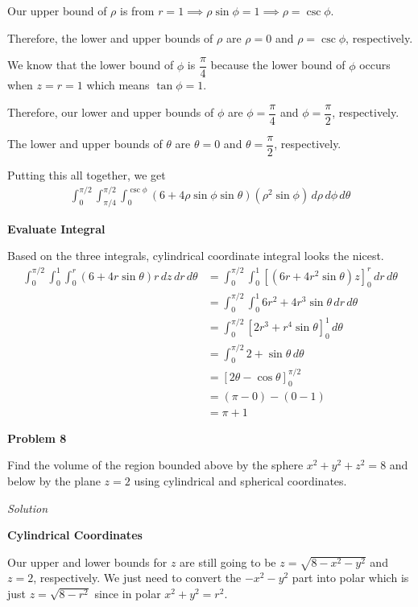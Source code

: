 \documentclass{article}
\newcommand{\lrp}[1]{\left( #1 \right)}
\newcommand{\lrb}[1]{\left[ #1 \right]}
\newcommand{\Solution}{\textit{Solution}}
\begin{document}
Our upper bound of $\rho$ is from $r=1\implies \rho \sin\phi = 1\implies \rho =\csc\phi$.

Therefore, the lower and upper bounds of $\rho$ are $\rho = 0$ and $\rho = \csc\phi$, respectively.

We know that the lower bound of $\phi$ is $\dfrac{\pi}{4}$ because the lower bound of $\phi$ occurs when $z=r=1$ which means $\tan\phi = 1$.

Therefore, our lower and upper bounds of $\phi$ are $\phi =\dfrac{\pi}{4}$ and $\phi =\dfrac{\pi}{2}$, respectively. 

The lower and upper bounds of $\theta$ are $\theta=0$ and $\theta=\dfrac{\pi}{2}$, respectively.

Putting this all together, we get
\begin{align*}
    \int_0^{\pi/2}\int_{\pi/4}^{\pi/2}\int_0^{\csc\phi} (6+4\rho\sin\phi\sin\theta)(\rho^2\sin\phi)\,d\rho\,d\phi\,d\theta\tag{in spherical, $y=\rho\sin\phi\sin\theta$}
\end{align*}
{}\textbf{Evaluate Integral}

Based on the three integrals, cylindrical coordinate integral looks the nicest.
\begin{align*}
     \int_{0}^{\pi/2}\int_0^1\int_0^r (6+4r\sin\theta)r\,dz\,dr\,d\theta&=\int_0^{\pi/2}\int_0^1\lrb{(6r+4r^2\sin\theta)z}_0^r\,dr\,d\theta\\
     &=\int_0^{\pi/2}\int_0^1 6r^2+4r^3\sin\theta\,dr\,d\theta\\
     &=\int_0^{\pi/2}\lrb{2r^3+r^4\sin\theta}_0^1\,d\theta\\
     &=\int_0^{\pi/2} 2 +\sin\theta\,d\theta\\
     &=\lrb{2\theta-\cos\theta}_0^{\pi/2}\\
     &=\lrp{\pi - 0}-\lrp{0-1}\\
     &=\boxed{\pi + 1}
\end{align*}
{}\textbf{Problem 8}

Find the volume of the region bounded above by the sphere $x^2+y^2+z^2=8$ and below by the plane $z=2$ using cylindrical and spherical coordinates.

\Solution

{}\textbf{Cylindrical Coordinates}

Our upper and lower bounds for $z$ are still going to be $z=\sqrt{8-x^2-y^2}$ and $z=2$, respectively. We just need to convert the $-x^2-y^2$ part into polar which is just $z=\sqrt{8-r^2}$ since in polar $x^2+y^2=r^2$.
\end{document}
